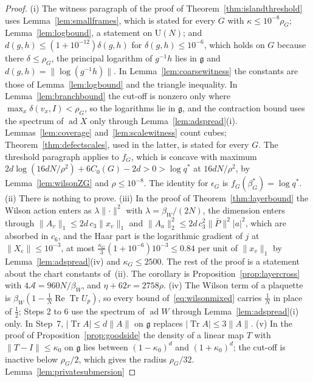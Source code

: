 \documentclass[11pt]{amsart}
\theoremstyle{definition}
\theoremstyle{remark}
\numberwithin{equation}{section}
\newcommand{\U}{\mathrm{U}}
\newcommand{\g}{\mathfrak{g}}
\newcommand{\Tr}{\operatorname{Tr}}
\newcommand{\ReTr}{\operatorname{Re}\operatorname{Tr}}
\begin{document}
\begin{proof}
(i) The witness paragraph of the proof of Theorem~\ref{thm:islandthreshold}
uses Lemma~\ref{lem:smallframes}, which is stated for every $G$ with
$\kappa\le10^{-8}\rho_G$; Lemma~\ref{lem:logbound}, a statement on $\U(N)$;
and $d(g,h)\le(1+10^{-12})\delta(g,h)$ for $\delta(g,h)\le10^{-6}$,
which holds on $G$ because there $\delta\le\rho_G$, the principal
logarithm of $g^{-1}h$ lies in $\g$ and $d(g,h)=\lVert\log(g^{-1}h)
\rVert$. In Lemma~\ref{lem:coarsewitness} the constants are those of
Lemma~\ref{lem:logbound} and the triangle inequality. In
Lemma~\ref{lem:branchbound} the cut-off is nonzero only where $\max_x
\delta(v_x,I)<\rho_G$, so the logarithms lie in $\g$, and the contraction
bound uses the spectrum of $\operatorname{ad}X$ only through
Lemma~\ref{lem:adspread}(i). Lemmas~\ref{lem:coverage}
and~\ref{lem:scalewitness} count cubes; Theorem~\ref{thm:defectscales},
used in the latter, is stated for every $G$. The threshold paragraph
applies to $f_G$, which is concave with maximum $2d\log(16dN/\rho^2)+6C_0
(G)-2d>0>\log q^*$ at $16dN/\rho^2$, by Lemma~\ref{lem:wilsonZG} and
$\rho\le10^{-8}$. The identity for $\epsilon_G$ is $f_G(\beta^*_G)=\log
q^*$.
(ii) There is nothing to prove.
(iii) In the proof of Theorem~\ref{thm:layerbound} the Wilson action
enters as $\lambda\lVert\cdot\rVert^2$ with $\lambda=\beta_W/(2N)$, the
dimension enters through $\lVert A_v\rVert_1\le2d\,c_3\lVert x_v
\rVert_1$ and $\lVert A_a\rVert_2^2\le2d\,c_3^2\lVert\bar P\rVert^2\lvert
a\rvert^2$, which are absorbed in $c_6$, and the Haar part is the
logarithmic gradient of $j$ at $\lVert X_e\rVert\le10^{-3}$, at most
$\frac{\kappa_G}3(1+10^{-6})10^{-3}\le0.84$ per unit of $\lVert x_v
\rVert_1$ by Lemma~\ref{lem:adspread}(iv) and $\kappa_G\le2500$. The rest
of the proof is a statement about the chart constants of~(ii). The
corollary is Proposition~\ref{prop:layercross} with $4\mathcal A=960N/
\beta_W$, and $\eta+62r=2758\rho$.
(iv) The Wilson term of a plaquette is $\beta_W(1-\frac1N\ReTr U_p)$, so
every bound of~\eqref{eq:wilsonmixed} carries $\frac1N$ in place of
$\frac12$; Steps 2 to 6 use the spectrum of $\operatorname{ad}W$ through
Lemma~\ref{lem:adspread}(i) only. In Step~7, $\lvert\Tr A\rvert\le d
\lVert A\rVert$ on $\g$ replaces $\lvert\Tr A\rvert\le3\lVert A\rVert$.
(v) In the proof of Proposition~\ref{prop:goodside} the density of a
linear map $T$ with $\lVert T-I\rVert\le\kappa_0$ on $\g$ lies between
$(1-\kappa_0)^d$ and $(1+\kappa_0)^d$; the cut-off is inactive below
$\rho_G/2$, which gives the radius $\rho_G/32$. Lemma~\ref{lem:privatesubmersion}

\end{proof}
\end{document}
